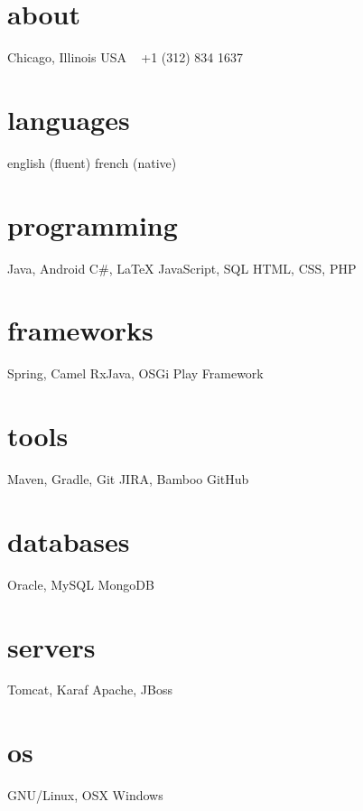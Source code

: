 \documentclass[]{friggeri-cv} %
\begin{document}



\begin{aside} %
\section{about}
{\color{darkgray}Chicago, Illinois
USA
~
+1 (312) 834 1637
~
\section{languages}
english (fluent)
french (native)
\section{programming}
Java, Android
C\#, \LaTeX
JavaScript, SQL
HTML, CSS, PHP
\section{frameworks}
Spring, Camel
RxJava, OSGi 
Play Framework
\section{tools}
Maven, Gradle, Git
JIRA, Bamboo
GitHub
\section{databases}
Oracle, MySQL
MongoDB}
\section{servers}
Tomcat, Karaf 
Apache, JBoss
\section{os}
GNU/Linux, OSX
Windows
\end{aside}
\end{document}
